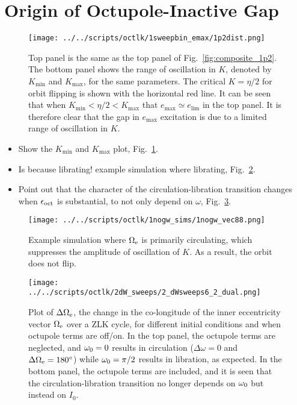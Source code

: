 \documentclass[
        fleqn,
        usenatbib,
    ]{mnras}
\newlength{\colummwidth}
\begin{document}
\clearpage
\onecolumn

\appendix

\section{Origin of Octupole-Inactive Gap}\label{app:gap}

\begin{figure}
    \centering
    \texttt{[image: ../../scripts/octlk/1sweepbin\_emax/1p2dist.png]}
    \caption{Top panel is the same as the top panel of
    Fig.~\ref{fig:composite_1p2}. The bottom panel shows the range of
    oscillation in $K$, denoted by $K_{\min}$ and $K_{\max}$, for the same
    parameters. The critical $K = \eta / 2$ for orbit flipping is shown with the
    horizontal red line. It can be seen that when $K_{\min} < \eta / 2 <
    K_{\max}$ that $e_{\max} \simeq e_{\lim}$ in the top panel. It is therefore
    clear that the gap in $e_{\max}$ excitation is due to a limited range of
    oscillation in $K$.
    }\label{fig:kdist}
\end{figure}

\begin{itemize}
    \item Show the $K_{\min}$ and $K_{\max}$ plot, Fig.~\ref{fig:kdist}.

    \item Is because librating! example simulation where librating,
        Fig.~\ref{fig:nogw_circ}.

    \item Point out that the character of the circulation-libration transition
        changes when $\epsilon_{\rm oct}$ is substantial, to not only depend on
        $\omega$, Fig.~\ref{fig:dW}.
\end{itemize}

\begin{figure}
    \centering
    \texttt{[image: ../../scripts/octlk/1nogw\_sims/1nogw\_vec88.png]}
    \caption{Example simulation where $\Omega_{\rm e}$ is primarily circulating,
    which suppresses the amplitude of oscillation of $K$. As a result, the orbit
    does not flip.}\label{fig:nogw_circ}
\end{figure}
\begin{figure}
    \centering
    \texttt{[image: ../../scripts/octlk/2dW\_sweeps/2\_dWsweeps6\_2\_dual.png]}
    \caption{Plot of $\Delta \Omega_{\rm e}$, the change in the co-longitude of
    the inner eccentricity vector $\Omega_{\rm e}$ over a ZLK cycle, for
    different initial conditions and when octupole terms are off/on. In the top
    panel, the octupole terms are neglected, and $\omega_{\rm 0} = 0$ results in
    circulation ($\Delta \omega = 0$ and $\Delta \Omega_{\rm e} = 180^\circ$)
    while $\omega_{\rm 0} = \pi / 2$ results in libration, as expected. In the
    bottom panel, the octupole terms are included, and it is seen that the
    circulation-libration transition no longer depends on $\omega_{\rm 0}$ but
    instead on $I_0$. }\label{fig:dW}
\end{figure}

\label{lastpage} %
\end{document}
